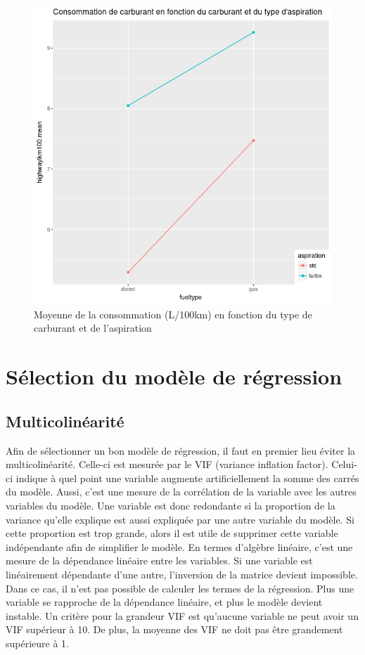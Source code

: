 \documentclass[11pt,a4paper]{article}
\begin{document}
\begin{figure}
	\centering
	\includegraphics[width=0.8\linewidth]{meanauto}
	\caption{Moyenne de la consommation (L/100km) en fonction du type de carburant et de l'aspiration}
	\label{fig:meanauto}
\end{figure}
\FloatBarrier
\section{Sélection du modèle de régression}

\subsection{Multicolinéarité}

Afin de sélectionner un bon modèle de régression, il faut en premier lieu éviter la multicolinéarité. Celle-ci est mesurée par le VIF (variance inflation factor). Celui-ci indique à quel point une variable augmente artificiellement la somme des carrés du modèle. Aussi, c'est une mesure de la corrélation de la variable avec les autres variables du modèle. Une variable est donc redondante si la proportion de la variance qu'elle explique est aussi expliquée par une autre variable du modèle. Si cette proportion est trop grande, alors il est utile de supprimer cette variable indépendante afin de simplifier le modèle. En termes d'algèbre linéaire, c'est une mesure de la dépendance linéaire entre les variables. Si une variable est linéairement dépendante d'une autre, l'inversion de la matrice devient impossible. Dans ce cas, il n'est pas possible de calculer les termes de la régression. Plus une variable se rapproche de la dépendance linéaire, et plus le modèle devient instable.
Un critère pour la grandeur VIF est qu'aucune variable ne peut avoir un VIF supérieur à 10. De plus, la moyenne des VIF ne doit pas être  grandement supérieure à 1.
\end{document}
